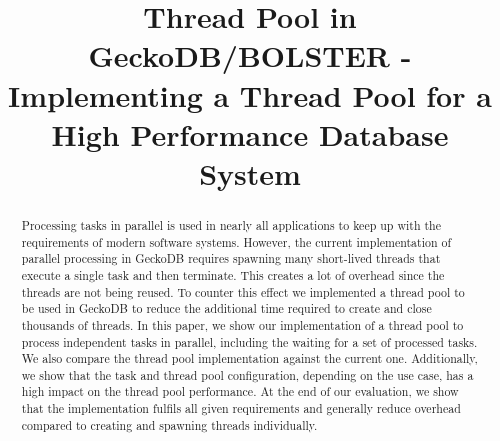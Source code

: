 \documentclass[conference]{IEEEtran}
\begin{document}


\title{Thread Pool in GeckoDB/BOLSTER - Implementing a Thread Pool for a High Performance Database System \\}

\author{
	 \and
}

\maketitle

\begin{abstract}
        Processing tasks in parallel is used in nearly all applications to keep
        up with the requirements of modern software systems. However, the
        current implementation of parallel processing in GeckoDB requires
        spawning many short-lived threads that execute a single task and then
        terminate. This creates a lot of overhead since the threads are not
        being reused. To counter this effect we implemented a thread pool to be
        used in GeckoDB to reduce the additional time required
        to create and close thousands of threads. In this paper, we show our
        implementation of a thread pool to process independent tasks in parallel,
        including the waiting for a set of processed tasks. We also compare the
        thread pool implementation against the current one. Additionally, we show that the task and thread pool configuration,
        depending on the use case, has a high impact on the thread
        pool performance. At the end of our evaluation, we show that the implementation 
        fulfils all given requirements and generally reduce
        overhead compared to creating and spawning threads individually.
\end{abstract}
\end{document}
